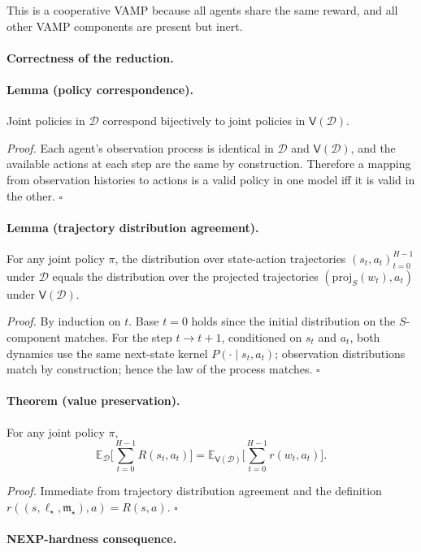This is a cooperative VAMP because all agents share the same reward, and all other VAMP components are present but inert.

\paragraph{Correctness of the reduction.}

\paragraph{Lemma (policy correspondence).}
Joint policies in \(\mathcal D\) correspond bijectively to joint policies in \(\mathsf V(\mathcal D)\).

\emph{Proof.} Each agent's observation process is identical in \(\mathcal D\) and \(\mathsf V(\mathcal D)\), and the available actions at each step are the same by construction. Therefore a mapping from observation histories to actions is a valid policy in one model iff it is valid in the other. \(\square\)

\paragraph{Lemma (trajectory distribution agreement).}
For any joint policy \(\pi\), the distribution over state-action trajectories \((s_t,a_t)_{t=0}^{H-1}\) under \(\mathcal D\) equals the distribution over the projected trajectories \((\mathrm{proj}_S(w_t),a_t)\) under \(\mathsf V(\mathcal D)\).

\emph{Proof.} By induction on \(t\). Base \(t=0\) holds since the initial distribution on the \(S\)-component matches. For the step \(t\to t+1\), conditioned on \(s_t\) and \(a_t\), both dynamics use the same next-state kernel \(P(\cdot\mid s_t,a_t)\); observation distributions match by construction; hence the law of the process matches. \(\square\)

\paragraph{Theorem (value preservation).}
For any joint policy \(\pi\),
\[
\mathbb E_{\mathcal D}\Big[\sum_{t=0}^{H-1} R(s_t,a_t)\Big]
=
\mathbb E_{\mathsf V(\mathcal D)}\Big[\sum_{t=0}^{H-1} r(w_t,a_t)\Big].
\]

\emph{Proof.} Immediate from trajectory distribution agreement and the definition \(r((s,\ell_\star,\mathfrak m_\star),a)=R(s,a)\). \(\square\)

\paragraph{NEXP-hardness consequence.}

